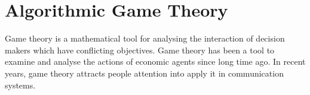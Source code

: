 

%




\section{Algorithmic Game Theory}

Game theory is a mathematical tool for analysing the interaction of decision makers which have conflicting objectives.
Game theory has been a tool to examine and analyse the actions of economic agents since long time ago.
In recent years, game theory attracts people attention into apply it in communication systems.

